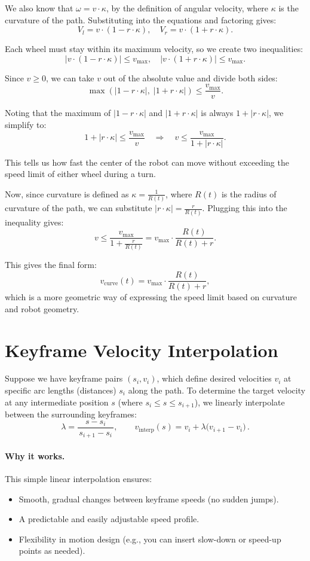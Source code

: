 \documentclass[11pt]{article}
\begin{document}
We also know that \(\omega = v \cdot \kappa\), by the definition of angular velocity, where \(\kappa\) is the curvature of the path. Substituting into the equations and factoring gives:
\[
V_l = v \cdot (1 - r \cdot \kappa), \quad V_r = v \cdot (1 + r \cdot \kappa).
\]

Each wheel must stay within its maximum velocity, so we create two inequalities:
\[
|v \cdot (1 - r \cdot \kappa)| \le v_{\max}, \quad |v \cdot (1 + r \cdot \kappa)| \le v_{\max}.
\]

Since \(v \ge 0\), we can take \(v\) out of the absolute value and divide both sides:
\[
\max\left(|1 - r \cdot \kappa|,\; |1 + r \cdot \kappa|\right) \le \frac{v_{\max}}{v}.
\]

Noting that the maximum of \(|1 - r \cdot \kappa|\) and \(|1 + r \cdot \kappa|\) is always \(1 + |r \cdot \kappa|\), we simplify to:
\[
1 + |r \cdot \kappa| \le \frac{v_{\max}}{v} \quad \Rightarrow \quad v \le \frac{v_{\max}}{1 + |r \cdot \kappa|}.
\]

This tells us how fast the center of the robot can move without exceeding the speed limit of either wheel during a turn.

Now, since curvature is defined as \(\kappa = \frac{1}{R(t)}\), where \(R(t)\) is the radius of curvature of the path, we can substitute \(|r \cdot \kappa| = \frac{r}{R(t)}\). Plugging this into the inequality gives:
\[
v \le \frac{v_{\max}}{1 + \frac{r}{R(t)}} = v_{\max} \cdot \frac{R(t)}{R(t) + r}.
\]

This gives the final form:
\[
v_{\text{curve}}(t) = v_{\max} \cdot \frac{R(t)}{R(t) + r},
\]
which is a more geometric way of expressing the speed limit based on curvature and robot geometry.

\section{Keyframe Velocity Interpolation}

Suppose we have keyframe pairs \((s_i, v_i)\), which define desired velocities \(v_i\) at specific arc lengths (distances) \(s_i\) along the path. To determine the target velocity at any intermediate position \(s\) (where $s_i \le s \le s_{i+1}$), we linearly interpolate between the surrounding keyframes:
\[
\lambda = \frac{s - s_i}{\,s_{i+1} - s_i\,}, 
\qquad
v_{\text{interp}}(s) = v_i + \lambda\big(v_{i+1} - v_i\big)\,.
\]

\paragraph{Why it works.} This simple linear interpolation ensures:
\begin{itemize}
  \item Smooth, gradual changes between keyframe speeds (no sudden jumps).
  \item A predictable and easily adjustable speed profile.
  \item Flexibility in motion design (e.g., you can insert slow-down or speed-up points as needed).
\end{itemize}
\end{document}
